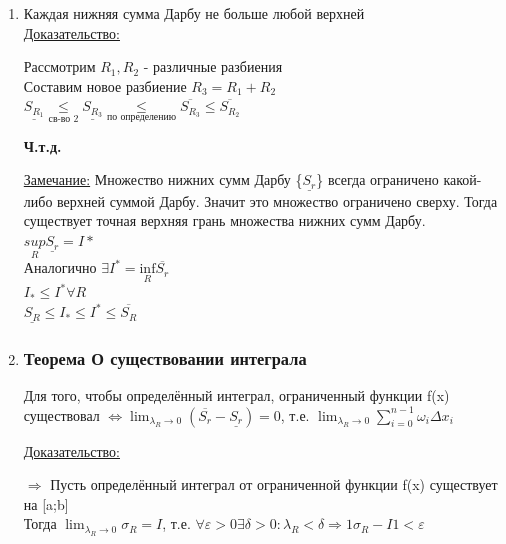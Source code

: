 \documentclass[12pt]{article}
\begin{document}
\begin{enumerate}
\begin{adjustwidth}{1.5em}{1.5em}
\begin{center}
                \textbf{Ч.т.д.}
            \end{center}
        \end{adjustwidth}
        \item Каждая нижняя сумма Дарбу не больше любой верхней\\
        \underline{Доказательство:}
        \begin{adjustwidth}{1.5em}{1.5em}
            Рассмотрим $R_1,R_2$ - различные разбиения\\
            Составим новое разбиение $R_3=R_1+R_2$\\
            $\underline{S_{R_1}} \underset{\text{св-во 2}}{\leq} \underline{S_{R_3}} \underset{\text{по определению}}{\leq} \overline{S_{R_3}} \leq \overline{S_{R_2}}$\\
            \begin{center}
                \textbf{Ч.т.д.}
            \end{center}
        \end{adjustwidth}
        \underline{Замечание:} Множество нижних сумм Дарбу \{$\underline{S_r}$\} всегда
        ограничено какой-либо верхней суммой Дарбу. Значит это множество ограничено сверху. Тогда существует
        точная верхняя грань множества нижних сумм Дарбу.\\
        $\underset{R}{sup} \underline{S_r} = I*$\\
        Аналогично $\exists I^* = \underset{R}{\text{inf}} \overline{S_r}$\\
        $I_* \leq I^* \forall R$\\
        $\underline{S_R} \leq I_* \leq I^* \leq \overline{S_R}$
        \item \subsubsection*{Теорема О существовании интеграла}\label{th:6.4.1}
        Для того, чтобы определённый интеграл, ограниченный функции f(x) существовал $\Leftrightarrow \lim_{\lambda_R \to 0} (\overline{S_r}-\underline{S_r})=0$,
        т.е. $\lim_{\lambda_R \to 0}\sum_{i=0}^{n-1} \omega_i \Delta x_i$ \par\noindent
        \underline{Доказательство:}
        \begin{adjustwidth}{1.5em}{1.5em}
            $\Rightarrow$ Пусть определённый интеграл от ограниченной функции f(x) существует на [a;b]\\
            Тогда $\lim_{\lambda_R \to 0} \sigma_R = I$, т.е. $\forall \varepsilon > 0 \exists \delta > 0:\lambda_R < \delta \Rightarrow 1 \sigma_R - I1 < \varepsilon$\\

\end{adjustwidth}
\end{enumerate}
\end{document}
